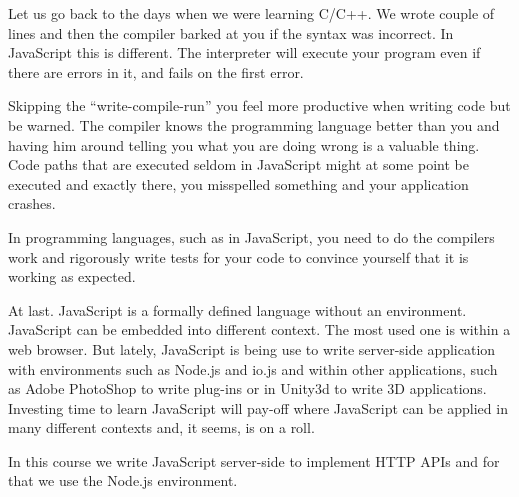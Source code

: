 Let us go back to the days when we were learning C/C++. We wrote couple of lines and then the compiler barked at you if the syntax was incorrect. In JavaScript this is different. The interpreter will execute your program even if there are errors in it, and fails on the first error. 

Skipping the ``write-compile-run'' you feel more productive when writing code but be warned. The compiler knows the programming language better than you and having him around telling you what you are doing wrong is a valuable thing. Code paths that are executed seldom in JavaScript might at some point be executed and exactly there, you misspelled something and your application crashes. 

In programming languages, such as in JavaScript, you need to do the compilers work and rigorously write tests for your code to convince yourself that it is working as expected.

At last. JavaScript is a formally defined language without an environment. JavaScript can be embedded into different context. The most used one is within a web browser. But lately, JavaScript is being use to write server-side application with environments such as Node.js and io.js and within other applications, such as Adobe PhotoShop to write plug-ins or in Unity3d to write 3D applications. Investing time to learn JavaScript will pay-off where JavaScript can be applied in many different contexts and, it seems, is on a roll.

In this course we write JavaScript server-side to implement HTTP APIs and for that we use the Node.js environment.

